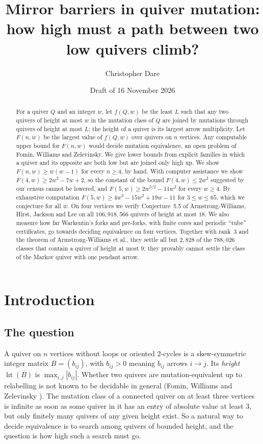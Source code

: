\documentclass[11pt]{amsart}
\title[Mirror barriers in quiver mutation]{Mirror barriers in quiver mutation:\\ how high must a path between two low quivers climb?}
\author{Christopher Dare}
\date{Draft of 16 November 2026}
\theoremstyle{definition}
\theoremstyle{remark}
\newcommand{\htt}{\operatorname{ht}}
\begin{document}
\begin{abstract}
For a quiver $Q$ and an integer $w$, let $f(Q,w)$ be the least $L$ such that any two quivers of height at most $w$ in the mutation class of $Q$ are joined by mutations through quivers of height at most $L$; the height of a quiver is its largest arrow multiplicity. Let $F(n,w)$ be the largest value of $f(Q,w)$ over quivers on $n$ vertices. Any computable upper bound for $F(n,w)$ would decide mutation equivalence, an open problem of Fomin, Williams and Zelevinsky. We give lower bounds from explicit families in which a quiver and its opposite are both low but are joined only high up. We show $F(n,w)\ge w(w-1)$ for every $n\ge 4$, by hand. With computer assistance we show $F(4,w)\ge 2w^2-7w+2$, so the constant of the bound $F(4,w)\le 2w^2$ suggested by our census cannot be lowered, and $F(5,w)\ge 2w^{5/2}-11w^2$ for every $w\ge 4$. By exhaustive computation $F(5,w)\ge 4w^3-15w^2+19w-11$ for $3\le w\le 65$, which we conjecture for all $w$. On four vertices we verify Conjecture~5.5 of Armstrong-Williams, Hirst, Jackson and Lee on all $106{,}918{,}566$ quivers of height at most $18$. We also measure how far Warkentin's forks and pre-forks, with finite cores and periodic ``tube'' certificates, go towards deciding equivalence on four vertices. Together with rank~$3$ and the theorem of Armstrong-Williams et al., they settle all but $2{,}828$ of the $788{,}026$ classes that contain a quiver of height at most $9$; they provably cannot settle the class of the Markov quiver with one pendant arrow.
\end{abstract}

\maketitle

\section{Introduction}\label{sec:intro}

\subsection{The question}
A quiver on $n$ vertices without loops or oriented $2$-cycles is a skew-symmetric integer matrix $B=(b_{ij})$, with $b_{ij}>0$ meaning $b_{ij}$ arrows $i\to j$. Its \emph{height} $\htt(B)$ is $\max_{i,j}|b_{ij}|$. Whether two quivers are mutation-equivalent up to relabelling is not known to be decidable in general (Fomin, Williams and Zelevinsky \cite[Problem~2.6.14]{FWZ}). The mutation class of a connected quiver on at least three vertices is infinite as soon as some quiver in it has an entry of absolute value at least $3$, but only finitely many quivers of any given height exist. So a natural way to decide equivalence is to search among quivers of bounded height, and the question is how high such a search must go.
\end{document}
